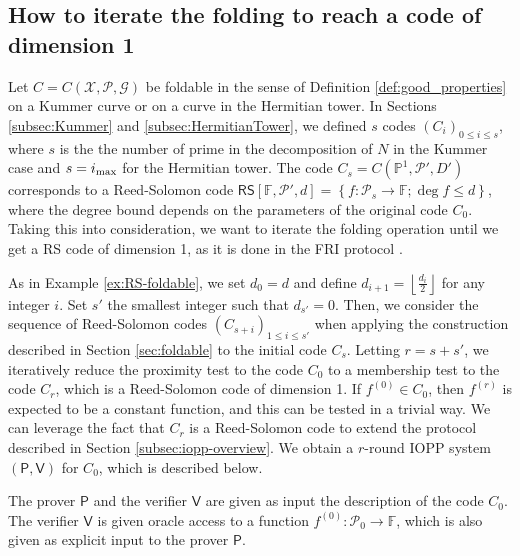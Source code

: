 \documentclass[a4paper,USenglish,autoref]{lipics-v2021}
\newcommand\F{\mathbb{F}}
\newcommand\PP{\mathbb{P}}
\newcommand\floor[1]{\left\lfloor #1 \right\rfloor}
\newcommand\RS[1]{\mathsf{RS}\left[\F,#1\right]}
\newcommand\prover{\mathsf{P}}
\newcommand\verifier{\mathsf{V}}
\newcommand{\set}[1]{\left\{#1\right\}}
\newcommand\calX{\mathcal{X}}
\newcommand\calP{\mathcal{P}}
\newcommand\calG{\mathcal{G}}
\newcommand{\ii}{i_{\rm{max}}}
\begin{document}
\subsection{How to iterate the folding to reach a code of dimension 1}\label{subsec:fast-iopp}
Let $C=C(\calX,\calP,\calG)$ be foldable in the sense of Definition \ref{def:good_properties} on a Kummer curve or on a curve in the Hermitian tower. In Sections \ref{subsec:Kummer} and \ref{subsec:HermitianTower}, we defined $s$ codes $(C_i)_{0\le i\le s}$, where $s$ is the the number of prime in the decomposition of $N$ in the Kummer case and $s=\ii$ for the Hermitian tower. The code $C_s = C(\PP^1, \calP', D')$ corresponds to a Reed-Solomon code $\RS{\calP', d} = \set{f : \calP_s \rightarrow \F; \deg f \le d}$, where the degree bound depends on the parameters of the original code $C_0$. Taking this into consideration, we want to iterate the folding operation until we get a RS code of dimension 1, as it is done in the \textsf{FRI} protocol \cite{BBHR18a}. 

As in Example \ref{ex:RS-foldable}, we set $d_0 = d$ and define $d_{i+1} = \floor{\frac{d_i}{2}}$ for any integer $i$. Set $s'$ the smallest integer such that $d_{s'} = 0$. Then, we consider the sequence of Reed-Solomon codes $(C_{s + i})_{1 \le i \le s'}$ when applying the construction described in Section \ref{sec:foldable} to the initial code $C_s$. Letting $r = s + s'$, we iteratively reduce the proximity test to the code $C_0$ to a membership test to the code $C_{r}$, which is a Reed-Solomon code of dimension 1. If $f^{(0)} \in C_0$, then $f^{(r)}$ is expected to be a constant function, and this can be tested in a trivial way. We can leverage the fact that $C_r$ is a Reed-Solomon code to extend the protocol described in Section \ref{subsec:iopp-overview}. We obtain a $r$-round IOPP system $(\prover, \verifier)$ for $C_0$, which is described below.

The prover $\prover$ and the verifier $\verifier$ are given as input the description of the code $C_0$.      
The verifier $\verifier$ is given oracle access to a function $f^{(0)} : \calP_0 \rightarrow \F$, which is also given as explicit input to the prover $\prover$.      
\end{document}
